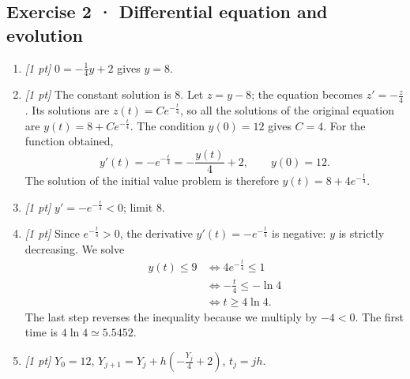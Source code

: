 \subsection*{Exercise 2 · Differential equation and evolution}\begin{enumerate}

\item \textit{[1 pt]} $0=-\frac{1}{4}y+2$ gives $y=8$.

\item \textit{[1 pt]} The constant solution is $8$. Let $z=y-8$; the equation becomes $z'=-\frac{z}{4}$. Its solutions are $z(t)=Ce^{-\frac{t}{4}}$, so all the solutions of the original equation are $y(t)=8+Ce^{-\frac{t}{4}}$.
The condition $y(0)=12$ gives $C=4$. For the function obtained,
\[y'(t)=-e^{-\frac{t}{4}}=-\frac{y(t)}{4}+2,\qquad y(0)=12.\]
The solution of the initial value problem is therefore $y(t)=8+4e^{-\frac{t}{4}}$.

\item \textit{[1 pt]} $y'=-e^{-\frac{t}{4}}<0$; limit $8$.

\item \textit{[1 pt]} Since $e^{-\frac{t}{4}}>0$, the derivative $y'(t)=-e^{-\frac{t}{4}}$ is negative: $y$ is strictly decreasing. We solve
\[\begin{aligned}y(t)\le 9&\Longleftrightarrow 4e^{-\frac{t}{4}}\le1\\&\Longleftrightarrow -\frac{t}{4}\le-\ln 4\\&\Longleftrightarrow t\ge 4\ln 4.\end{aligned}\]
The last step reverses the inequality because we multiply by $-4<0$. The first time is $4\ln 4\simeq\num{5,5452}$.

\item \textit{[1 pt]} $Y_0=12$, $Y_{j+1}=Y_j+h(-\frac{Y_j}{4}+2)$, $t_j=jh$.

\end{enumerate}

